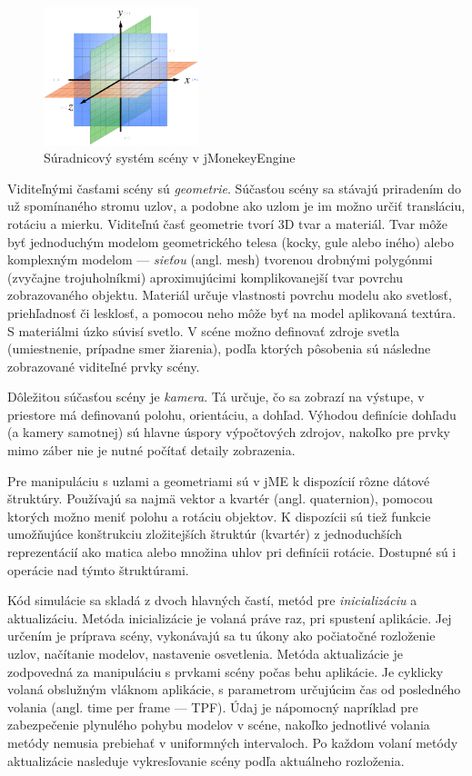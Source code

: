 \begin{figure}
\centerline{\includegraphics[width=0.4\textwidth]{images/coordinate-system}}
\caption[Súradnicový systém scény v jMonekeyEngine]{Súradnicový systém scény v jMonekeyEngine}
\label{obr:coordinate-system}
\end{figure}

Viditeľnými časťami scény sú \textit{geometrie}. Súčasťou scény sa stávajú priradením do už spomínaného stromu uzlov, a podobne ako uzlom je im možno určiť transláciu, rotáciu a mierku. Viditeľnú časť geometrie tvorí 3D tvar a materiál. Tvar môže byť jednoduchým modelom geometrického telesa (kocky, gule alebo iného) alebo komplexným modelom --- \textit{sieťou} (angl. mesh) tvorenou drobnými polygónmi (zvyčajne trojuholníkmi) aproximujúcimi komplikovanejší tvar povrchu zobrazovaného objektu. Materiál určuje vlastnosti povrchu modelu ako svetlosť, priehľadnosť či lesklosť, a pomocou neho môže byť na model aplikovaná textúra. S materiálmi úzko súvisí svetlo. V scéne možno definovať zdroje svetla (umiestnenie, prípadne smer žiarenia), podľa ktorých pôsobenia sú následne zobrazované viditeľné prvky scény.

Dôležitou súčasťou scény je \textit{kamera}. Tá určuje, čo sa zobrazí na výstupe, v priestore má definovanú polohu, orientáciu, a dohľad. Výhodou definície dohľadu (a kamery samotnej) sú hlavne úspory výpočtových zdrojov, nakoľko pre prvky mimo záber nie je nutné počítať detaily zobrazenia.

Pre manipuláciu s uzlami a geometriami sú v jME k dispozícií rôzne dátové štruktúry. Používajú sa najmä vektor a kvartér (angl. quaternion), pomocou ktorých možno meniť polohu a rotáciu objektov. K dispozícii sú tiež funkcie umožňujúce konštrukciu zložitejších štruktúr (kvartér) z jednoduchších reprezentácií ako matica alebo množina uhlov pri definícii rotácie. Dostupné sú i operácie nad týmto štruktúrami.

Kód simulácie sa skladá z dvoch hlavných častí, metód pre \textit{inicializáciu} a aktualizáciu. Metóda inicializácie je volaná práve raz, pri spustení aplikácie. Jej určením je príprava scény, vykonávajú sa tu úkony ako počiatočné rozloženie uzlov, načítanie modelov, nastavenie osvetlenia. Metóda aktualizácie je zodpovedná za manipuláciu s prvkami scény počas behu aplikácie. Je cyklicky volaná obslužným vláknom aplikácie, s parametrom určujúcim čas od posledného volania (angl. time per frame --- TPF). Údaj je nápomocný napríklad pre zabezpečenie plynulého pohybu modelov v scéne, nakoľko jednotlivé volania metódy nemusia prebiehať v uniformných intervaloch. Po každom volaní metódy aktualizácie nasleduje vykresľovanie scény podľa aktuálneho rozloženia.

